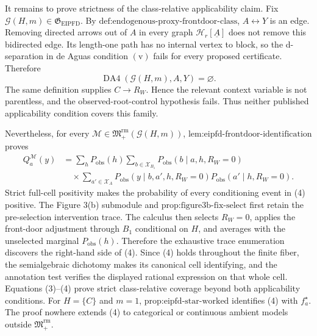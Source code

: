 It remains to prove strictness of the class-relative applicability claim. Fix \(\mathcal G(H,m)\in\mathfrak G_{\mathrm{EIPFD}}\). By \(\text{def:endogenous-proxy-frontdoor-class}\), \(A\leftrightarrow Y\) is an edge. Removing directed arrows out of \(A\) in every graph \(\mathcal H_r[\underline A]\) does not remove this bidirected edge. Its length-one path has no internal vertex to block, so the d-separation in de Aguas condition \(\mathrm{(v)}\) fails for every proposed certificate. Therefore
\[
\operatorname{DA4}(\mathcal G(H,m),A,Y)=\varnothing.
\tag{3}
\]
The same definition supplies \(C\to R_W\). Hence the relevant context variable is not parentless, and the observed-root-control hypothesis fails. Thus neither published applicability condition covers this family.

Nevertheless, for every \(\mathcal M\in\mathfrak M_{+}^{\mathrm{rm}}(\mathcal G(H,m))\), \(\text{lem:eipfd-frontdoor-identification}\) proves
\[
\begin{aligned}
Q_a^{\mathcal M}(y)
&=\sum_hP_{\mathrm{obs}}(h)
\sum_{b\in\mathcal X_{B_1}}
P_{\mathrm{obs}}(b\mid a,h,R_W=0)\\
&\quad\times
\sum_{a'\in\mathcal X_A}
P_{\mathrm{obs}}(y\mid b,a',h,R_W=0)
P_{\mathrm{obs}}(a'\mid h,R_W=0).
\end{aligned}
\tag{4}
\]
Strict full-cell positivity makes the probability of every conditioning event in (4) positive. The Figure 3(b) submodule and \(\text{prop:figure3b-fix-select}\) first retain the pre-selection intervention trace. The calculus then selects \(R_W=0\), applies the front-door adjustment through \(B_1\) conditional on \(H\), and averages with the unselected marginal \(P_{\mathrm{obs}}(h)\). Therefore the exhaustive trace enumeration discovers the right-hand side of (4). Since (4) holds throughout the finite fiber, the semialgebraic dichotomy makes its canonical cell identifying, and the annotation test verifies the displayed rational expression on that whole cell. Equations (3)--(4) prove strict class-relative coverage beyond both applicability conditions. For \(H=\{C\}\) and \(m=1\), \(\text{prop:eipfd-star-worked}\) identifies (4) with \(f_a^\star\). The proof nowhere extends (4) to categorical or continuous ambient models outside \(\mathfrak M_{+}^{\mathrm{rm}}\).